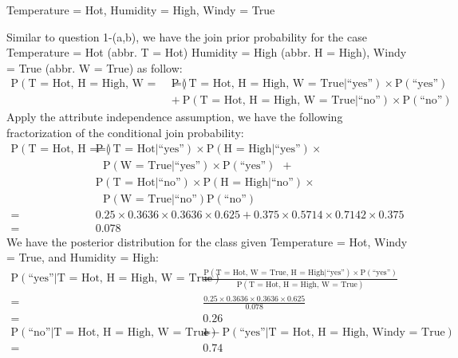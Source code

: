 \documentclass[12pt,twoside]{article}
\begin{document}
\begin{exercises}
\begin{exerciseparts}
  \exercisepart Temperature = Hot, Humidity = High, Windy = True

  \ifsolution \solution{}
    Similar to question 1-(a,b), we have the join prior probability
    for the case Temperature = Hot (abbr. T = Hot) Humidity = High 
    (abbr. H = High), Windy = True (abbr. W = True) as follow:
    \begin{equation*}
      \begin{aligned}
        \mbox{P}(\mbox{T = Hot, H = High, W = True}) 
          = \ & \mbox{P}(\mbox{T = Hot, H = High, W = True}|\mbox{``yes''})  \times \mbox{P}(\mbox{``yes''})
          \\ & + \ 
             \mbox{P}(\mbox{T = Hot, H = High, W = True}|\mbox{``no''})  \times \mbox{P}(\mbox{``no''})
      \end{aligned}
    \end{equation*}
    Apply the attribute independence assumption, we have the following
    fractorization of the conditional join probability:
    \begin{equation*}
      \begin{aligned}
        \mbox{P}(\mbox{T = Hot, H = High, W = True}) 
          = \ & \mbox{P}(\mbox{T = Hot}|\mbox{``yes''}) \times
                \mbox{P}(\mbox{H = High}|\mbox{``yes''}) \times \\
              & \ \ \ \mbox{P}(\mbox{W = True}|\mbox{``yes''}) \times \mbox{P}(\mbox{``yes''})\ \ + \\
              & \mbox{P}(\mbox{T = Hot}|\mbox{``no''}) \times
                \mbox{P}(\mbox{H = High}|\mbox{``no''}) \times \\
              & \ \ \ \mbox{P}(\mbox{W = True}|\mbox{``no''}) \mbox{P}(\mbox{``no''}) \\
          = \ & 0.25 \times 0.3636 \times 0.3636 \times 0.625 + 
              0.375 \times 0.5714 \times 0.7142 \times 0.375 \\
          = \ & 0.078
      \end{aligned}
    \end{equation*}
    We have the posterior distribution for the class given Temperature = Hot, Windy = True, and Humidity = High:
    \begin{equation*}
      \begin{aligned}
        \mbox{P}(\mbox{``yes''} | \mbox{T = Hot, H = High, W = True}) 
        = & \ \frac{\mbox{P}(\mbox{T = Hot, W = True, H = High} | \mbox{``yes''}) \times
        \mbox{P}(\mbox{``yes''})}{\mbox{P}(\mbox{T = Hot, H = High, W = True})} \\
        = & \ \frac{0.25 \times 0.3636 \times 0.3636 \times 0.625}{0.078} \\
        = & \ \boldsymbol{0.26} \\
        \mbox{P}(\mbox{``no''} | \mbox{T = Hot, H = High, W = True}) 
        = & \ 1 - \mbox{P}(\mbox{``yes''} | \mbox{T = Hot, H = High, Windy = True})  \\
        = & \ \boldsymbol{0.74}
      \end{aligned}
    \end{equation*}
  \fi
\end{exerciseparts}


\end{exercises}
\end{document}

